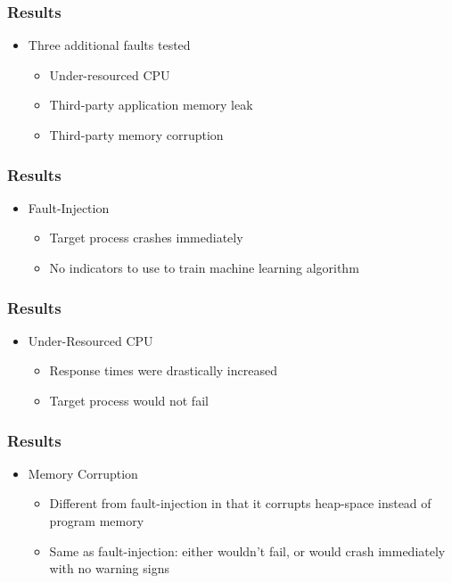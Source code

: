 \documentclass[aspectratio=169]{beamer}
\begin{document}
\begin{frame}
  \frametitle{Results}
  \begin{itemize}
  \item{Three additional faults tested}
    \begin{itemize}
    \item{Under-resourced CPU}
    \item{Third-party application memory leak}
    \item{Third-party memory corruption}
    \end{itemize}
  \end{itemize}
\end{frame}


\begin{frame}
  \frametitle{Results}
  \begin{itemize}
  \item{Fault-Injection}
    \begin{itemize}
    \item{Target process crashes immediately}
    \item{No indicators to use to train machine learning algorithm}
    \end{itemize}
  \end{itemize}
\end{frame}


\begin{frame}
  \frametitle{Results}
  \begin{itemize}
  \item{Under-Resourced CPU}
    \begin{itemize}
    \item{Response times were drastically increased}
    \item{Target process would not fail}
    \end{itemize}
  \end{itemize}
\end{frame}


\begin{frame}
  \frametitle{Results}
  \begin{itemize}
  \item{Memory Corruption}
    \begin{itemize}
    \item{Different from fault-injection in that it corrupts heap-space instead
    of program memory}
    \item{Same as fault-injection: either wouldn't fail, or would crash
    immediately with no warning signs}
    \end{itemize}
  \end{itemize}
\end{frame}
\end{document}
